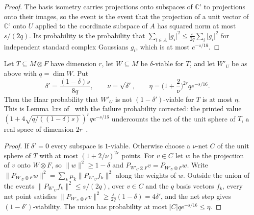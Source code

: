 \begin{proof}
    \leanok
    The basis isometry carries projections onto subspaces of
    $\mathbb C^\iota$ to projections onto their images, so the event is the
    event that the projection of a unit vector of $\mathbb C^\iota$ onto
    $U$ applied to the coordinate subspace of $A$ has squared norm at most
    $s/(2q)$. Its probability is the probability that
    $\sum_{i\in A}\lvert g_i\rvert^2\le\frac{s}{2q}\sum_i\lvert g_i\rvert^2$
    for independent standard complex Gaussians $g_i$, which is at most
    $e^{-s/16}$.
\end{proof}

\begin{theorem}
    \label{thm:viable_random_sampling}
    \leanok
    Let $T\subseteq M\otimes F$ have dimension $r$, let $W\subseteq M$ be
    $\delta$-viable for $T$, and let $W'_U$ be as above with
    $q=\dim W$. Put
    \[
        \delta'=\frac{(1-\delta)s}{8q},\qquad\nu=\sqrt{\delta'},\qquad
        \eta=\Big(1+\frac2\nu\Big)^{2r}qe^{-s/16}.
    \]
    Then the Haar probability that $W'_U$ is not $(1-\delta')$-viable for
    $T$ is at most $\eta$. This is Lemma~l:rs
    of~\cite[lines 532--547]{Arad2016RigorousRG} with the failure
    probability corrected: the printed value
    $(1+4\sqrt{q/((1-\delta)s)})^rqe^{-s/16}$ undercounts the net of the
    unit sphere of $T$, a real space of dimension
    $2r$~\cite{gap:alvv16_random_sampling_net_count}.
\end{theorem}

\begin{proof}
    \leanok
    If $\delta'=0$ every subspace is $1$-viable. Otherwise choose a
    $\nu$-net $C$ of the unit sphere of $T$ with at most $(1+2/\nu)^{2r}$
    points. For $v\in C$ let $w$ be the projection of $v$ onto $W\otimes F$,
    so $\lVert w\rVert^2\ge1-\delta$ and
    $P_{W'_U\otimes F}v=P_{W'_U\otimes F}w$. Write
    $\lVert P_{W'_U\otimes F}w\rVert^2=\sum_k\mu_k\lVert P_{W'_U}f_k\rVert^2$
    along the weights of $w$. Outside the union of the events
    $\lVert P_{W'_U}f_k\rVert^2\le s/(2q)$, over $v\in C$ and the $q$ basis
    vectors $f_k$, every net point satisfies
    $\lVert P_{W'_U\otimes F}v\rVert^2\ge\frac{s}{2q}(1-\delta)=4\delta'$,
    and the net step gives $(1-\delta')$-viability. The union has
    probability at most $\lvert C\rvert qe^{-s/16}\le\eta$.
\end{proof}

